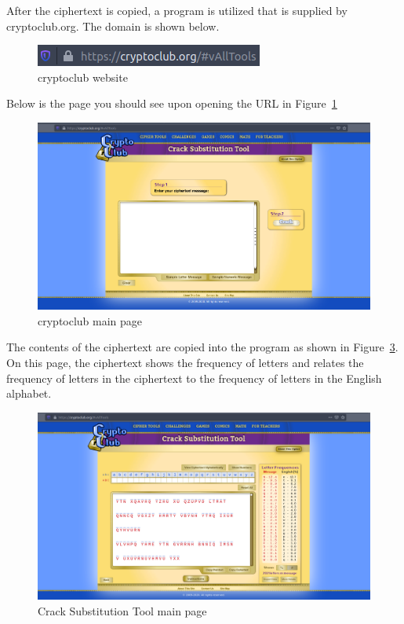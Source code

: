 \documentclass[12pt]{article}
\begin{document}
After the ciphertext is copied, a program is utilized that is supplied by cryptoclub.org. The domain is shown below.

\begin{figure}[!ht]
    \begin{center}
        \includegraphics[scale=0.65]{c0.1.png}
    \end{center}{}
    \caption{cryptoclub website}
    \label{fig:c0.1}
\end{figure}

\clearpage

Below is the page you should see upon opening the URL in Figure~\ref{fig:c0.1}

\begin{figure}[!ht]
    \begin{center}
        \includegraphics[scale=0.3]{c1.png}
    \end{center}{}
    \caption{cryptoclub main page}
    \label{fig:c1}
\end{figure}


The contents of the ciphertext are copied into the program as shown in Figure~\ref{fig:c3}. On this page, the ciphertext
shows the frequency of letters and relates the frequency of letters in the ciphertext to the frequency of letters in the
English alphabet.


\begin{figure}[!ht]
    \begin{center}
        \includegraphics[scale=0.3]{c3.png}
    \end{center}{}
    \caption{Crack Substitution Tool main page}
    \label{fig:c3}
\end{figure}
\end{document}
